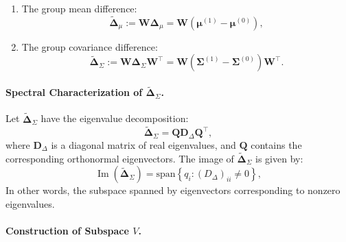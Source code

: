 \documentclass[ecta,nameyear,final]{econsocart}
\numberwithin{equation}{section}
\theoremstyle{plain}
\theoremstyle{definition}
\begin{document}
\begin{appendix}
\begin{enumerate}
    \item The group mean difference:
    $$
    \tilde{\boldsymbol{\Delta}}_{\mu} := \mathbf{W} \boldsymbol{\Delta}_{\mu} = \mathbf{W}(\boldsymbol{\mu}^{(1)} - \boldsymbol{\mu}^{(0)}),
    $$

    \item The group covariance difference:
    $$
    \tilde{\boldsymbol{\Delta}}_{\Sigma} := \mathbf{W} \boldsymbol{\Delta}_{\Sigma} \mathbf{W}^\top = \mathbf{W}(\boldsymbol{\Sigma}^{(1)} - \boldsymbol{\Sigma}^{(0)})\mathbf{W}^\top.
    $$
\end{enumerate}

\paragraph{Spectral Characterization of $\tilde{\boldsymbol{\Delta}}_{\Sigma}$.}

Let $\tilde{\boldsymbol{\Delta}}_{\Sigma}$ have the eigenvalue decomposition:
$$
\tilde{\boldsymbol{\Delta}}_{\Sigma} = \mathbf{Q} \mathbf{\mathbf{D}}_{\Delta} \mathbf{Q}^\top,
$$
where $\mathbf{\mathbf{D}}_{\Delta}$ is a diagonal matrix of real eigenvalues, and $\mathbf{Q}$ contains the corresponding orthonormal eigenvectors.
\newline \newline
The image of $\tilde{\boldsymbol{\Delta}}_{\Sigma}$ is given by:
$$
\operatorname{Im}(\tilde{\boldsymbol{\Delta}}_{\Sigma}) = \mathrm{span}\left\{ q_i : (D_\Delta)_{ii} \neq 0 \right\},
$$
In other words, the subspace spanned by eigenvectors corresponding to nonzero eigenvalues.

\paragraph{Construction of Subspace $V$.}


\end{appendix}
\end{document}

